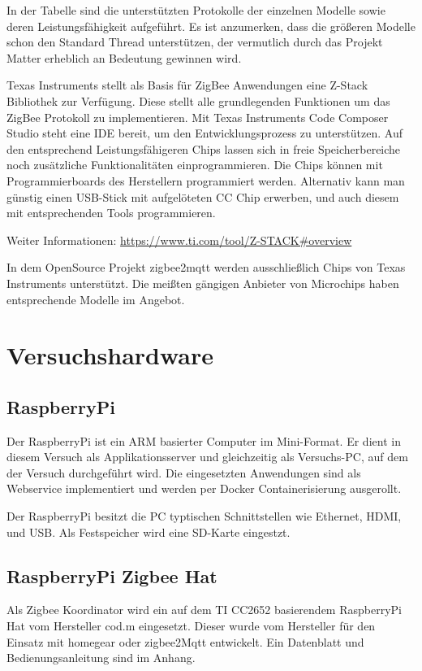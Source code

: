 In der Tabelle sind die unterstützten Protokolle der einzelnen Modelle sowie deren Leistungsfähigkeit aufgeführt.
Es ist anzumerken, dass die größeren Modelle schon den Standard Thread unterstützen, der vermutlich durch das
Projekt \grqq Matter\grqq{} erheblich an Bedeutung gewinnen wird.

Texas Instruments stellt als Basis für ZigBee Anwendungen eine Z-Stack Bibliothek zur Verfügung. Diese stellt alle grundlegenden 
Funktionen um das ZigBee Protokoll zu implementieren. Mit Texas Instruments Code Composer Studio steht eine IDE bereit,
um den Entwicklungsprozess zu unterstützen. Auf den entsprechend Leistungsfähigeren Chips lassen sich in freie Speicherbereiche noch zusätzliche
Funktionalitäten einprogrammieren. Die Chips können mit Programmierboards des Herstellern programmiert werden. Alternativ kann man
günstig einen USB-Stick mit aufgelöteten CC Chip erwerben, und auch diesem mit entsprechenden Tools programmieren.

Weiter Informationen: \url{https://www.ti.com/tool/Z-STACK#overview}

In dem OpenSource Projekt zigbee2mqtt werden ausschließlich Chips von Texas Instruments unterstützt. Die meißten gängigen Anbieter von Microchips 
haben entsprechende Modelle im Angebot. 

\section{Versuchshardware}

\subsection{RaspberryPi}

Der RaspberryPi ist ein ARM basierter Computer im Mini-Format. Er dient in diesem Versuch als Applikationsserver und gleichzeitig als Versuchs-PC, 
auf dem der Versuch durchgeführt wird. Die eingesetzten Anwendungen sind 
als Webservice implementiert und werden per Docker Containerisierung ausgerollt.

Der RaspberryPi besitzt die PC typtischen Schnittstellen wie Ethernet, HDMI, und USB. Als Festspeicher wird eine
SD-Karte eingestzt. 

\subsection{RaspberryPi Zigbee Hat}

Als Zigbee Koordinator wird ein auf dem TI CC2652 basierendem RaspberryPi Hat vom Hersteller \grqq cod.m\grqq{} eingesetzt. Dieser wurde vom Hersteller
für den Einsatz mit \grqq homegear\grqq{} oder \grqq zigbee2Mqtt\grqq{} entwickelt. Ein Datenblatt und Bedienungsanleitung sind im Anhang.

